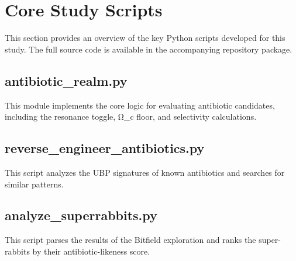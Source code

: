 \documentclass[12pt, a4paper]{article}
\begin{document}
\appendix

\section{Core Study Scripts}

This section provides an overview of the key Python scripts developed for this study. The full source code is available in the accompanying repository package.

\subsection{antibiotic\_realm.py}

This module implements the core logic for evaluating antibiotic candidates, including the resonance toggle, Ω_c floor, and selectivity calculations.



\subsection{reverse\_engineer\_antibiotics.py}

This script analyzes the UBP signatures of known antibiotics and searches for similar patterns.



\subsection{analyze\_superrabbits.py}

This script parses the results of the Bitfield exploration and ranks the super-rabbits by their antibiotic-likeness score.


\end{document}
